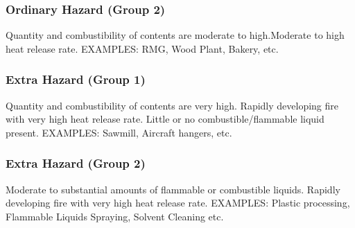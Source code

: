 \documentclass{article}
\begin{document}
\subsubsection*{Ordinary Hazard (Group 2)}
Quantity and combustibility of contents are moderate to high.Moderate to high heat release rate. EXAMPLES: RMG, Wood Plant, Bakery, etc.

\subsubsection*{Extra Hazard (Group 1)}
Quantity and combustibility of contents are very high. Rapidly developing fire with very high heat release rate. Little or no combustible/flammable liquid present. EXAMPLES: Sawmill, Aircraft hangers, etc.

\subsubsection*{Extra Hazard (Group 2)}
Moderate to substantial amounts of flammable or combustible
liquids. Rapidly developing fire with very high heat release rate. EXAMPLES: Plastic processing, Flammable Liquids
Spraying, Solvent Cleaning etc.
\end{document}
